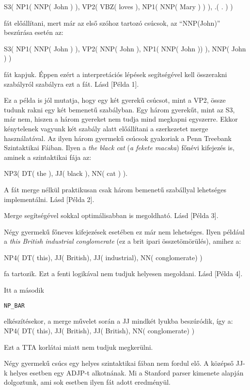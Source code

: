 S3( NP1( NNP( John ) ), VP2( VBZ( loves ),  NP1( NNP( Mary ) ) ), .( . ) )

fát előállítani, mert már az első szóhoz tartozó csúcsok, az “NNP(John)” beszúrása esetén az:

S3( NP1( NNP( John ) ), VP2( NNP( John ),  NP1( NNP( John )) ), NNP( John ) )

fát kapjuk. Éppen ezért a interpretációs lépések segítségével kell összerakni szabályról szabályra ezt a fát. Lásd [Példa 1].

Ez a példa is jól mutatja, hogy egy két gyerekű csúcsot, mint a VP2, össze tudunk rakni egy két bemenetű szabályban. Egy három gyerekűt, mint az S3, már nem, hiszen a három gyereket nem tudja mind megkapni egyszerre. Ekkor kénytelenek vagyunk két szabály alatt előállítani a szerkezetet merge használatával. Az ilyen három gyermekű csúcsok gyakoriak a Penn Treebank Szintaktikai Fáiban.  Ilyen a \textit{the black cat} (\textit{a fekete macska}) főnévi kifejezés is, aminek a szintaktikai fája az:

NP3( DT( the ), JJ( black ), NN( cat ) ).

A fát merge nélkül praktikusan csak három bemenetű szabállyal lehetséges implementálni.
Lásd [Példa 2].

Merge segítségével sokkal optimálisabban is megoldható. Lásd [Példa 3].

Négy gyermekű főneves kifejezések esetében ez már nem lehetséges. Ilyen például a \textit{this British industrial conglomerate} (ez a brit ipari összetömörülés), amihez  a:

NP4( DT( this), JJ( British), JJ( industrial), NN( conglomerate) )

fa tartozik. Ezt a fenti logikával nem tudjuk helyesen megoldani. Lásd [Példa 4].

Itt a második\begin{verbatim}NP_BAR 
\end{verbatim}elkészítésekor, a merge művelet során a JJ  mindkét lyukba beszúródik, így a: NP4( DT( this), JJ( British), JJ( British), NN( conglomerate) )

Ezt a TTA korlátai miatt nem tudjuk megkerülni.

Négy gyermekű csúcs egy helyes szintaktikai fában nem fordul elő. A középső JJ-k helyes esetben egy ADJP-t alkotnának. Mi a Stanford parser kimenete alapján dolgoztunk, ami sok esetben ilyen fát adott eredményül.


